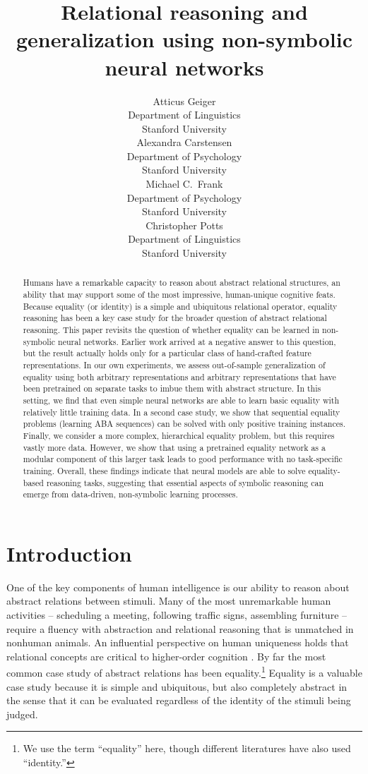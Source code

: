 \documentclass{article}
\title{Relational reasoning and generalization using non-symbolic neural networks}
\author{%
  Atticus Geiger \\
  Department of Linguistics\\
  Stanford University \\
  \And
  Alexandra Carstensen \\
  Department of Psychology \\
  Stanford University \\
  \AND
  Michael C.~Frank \\
  Department of Psychology \\
  Stanford University \\
  \And
  Christopher Potts \\
  Department of Linguistics\\
  Stanford University
}
\newcommand{\update}[1]{{\color{darkblue}#1}}
\newcommand{\updatea}[1]{{\color{darkred}#1}}
\begin{document}
\maketitle

\begin{abstract}
\update{%
  Humans have a remarkable capacity to reason about abstract relational structures, an ability that may support some of the most impressive, human-unique cognitive feats. Because equality (or identity) is a simple and ubiquitous relational operator, equality reasoning has been a key case study for the broader question of abstract relational reasoning. This paper revisits the question of whether equality can be learned in non-symbolic neural networks. \updatea{Earlier work arrived at a negative answer to this question, but the result actually holds only for a particular class of hand-crafted feature representations.} In our own experiments, we assess out-of-sample generalization of equality using both arbitrary representations and arbitrary representations that have been pretrained on separate tasks to imbue them with abstract structure. In this setting, we find that even simple neural networks are able to learn basic equality with relatively little training data. In a second case study, we show that sequential equality problems (learning ABA sequences) can be solved with only positive training instances. Finally, we consider a more complex, hierarchical equality problem, but this requires vastly more data. However, we show that using a pretrained equality network as a modular component of this larger task leads to good performance with no task-specific training. Overall, these findings indicate that neural models are able to solve equality-based reasoning tasks, suggesting that essential aspects of symbolic reasoning can emerge from data-driven, non-symbolic learning processes.%
}
\end{abstract}


\section{Introduction}\label{sec:introduction}

One of the key components of human intelligence is our ability to reason about abstract relations between stimuli. Many of the most unremarkable human activities -- scheduling a meeting, following traffic signs, assembling furniture -- require a fluency with abstraction and relational reasoning that is unmatched in nonhuman animals. An influential perspective on human uniqueness holds that relational concepts are critical to higher-order cognition \citep[e.g.,][]{Gentner:2003}. By far the most common case study of abstract relations has been equality.\footnote{We use the term ``equality'' here, though different literatures have also used ``identity.''} Equality is a valuable case study because it is simple and ubiquitous, but also completely abstract in the sense that it can be evaluated regardless of the identity of the stimuli being judged.
\end{document}

